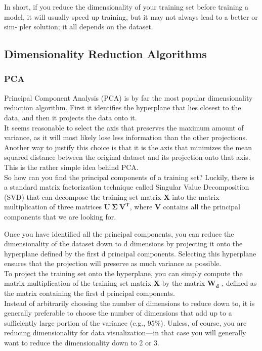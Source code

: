 \documentclass[french]{article}
\begin{document}
In short, if you reduce the dimensionality of your training set before training a model, it will usually speed up training, but it may not always lead to a better or sim‐ pler solution; it all depends on the dataset.

\subsection{Dimensionality Reduction Algorithms}

\subsubsection{PCA}

Principal Component Analysis (PCA) is by far the most popular dimensionality reduction algorithm. First it identifies the hyperplane that lies closest to the data, and then it projects the data onto it.\\

It seems reasonable to select the axis that preserves the maximum amount of variance, as it will most likely lose less information than the other projections. Another way to justify this choice is that it is the axis that minimizes the mean squared distance between the original dataset and its projection onto that axis. This is the rather simple idea behind PCA.\\

So how can you find the principal components of a training set? Luckily, there is a standard matrix factorization technique called Singular Value Decomposition (SVD) that can decompose the training set matrix $\bm{X}$ into the matrix multiplication of three matrices $\bm{U\ \Sigma\ V^T}$, where $\bm{V}$ contains all the principal components that we are looking for.

Once you have identified all the principal components, you can reduce the dimensionality of the dataset down to d dimensions by projecting it onto the hyperplane defined by the first d principal components. Selecting this hyperplane ensures that the projection will preserve as much variance as possible.\\

To project the training set onto the hyperplane, you can simply compute the matrix multiplication of the training set matrix $\bm{X}$ by the matrix $\bm{W_d}$ , defined as the matrix containing the first d principal components.\\

Instead of arbitrarily choosing the number of dimensions to reduce down to, it is generally preferable to choose the number of dimensions that add up to a sufficiently large portion of the variance (e.g., 95\%). Unless, of course, you are reducing dimensionality for data visualization—in that case you will generally want to reduce the dimensionality down to 2 or 3.\\
\end{document}

